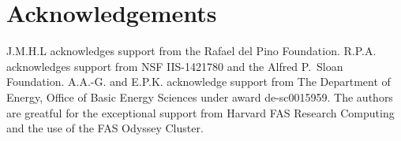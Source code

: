 \section{Acknowledgements}
J.M.H.L acknowledges support from the Rafael del Pino Foundation.
R.P.A. acknowledges support from NSF IIS-1421780 and the Alfred P.\ Sloan Foundation.
A.A.-G. and E.P.K. acknowledge support from The Department
of Energy, Office of Basic Energy Sciences under
award de-sc0015959. The
authors are greatful for the exceptional support from
Harvard FAS Research Computing and the use of the
FAS Odyssey Cluster.